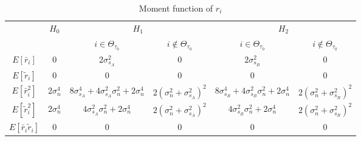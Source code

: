\begin{table}[h]
\centering
  \begin{tabular}{|c|c|c|c|c|c|}
	\hline
	\multirow{2}{*}{}           & \multirow{2}{*}{$H_0$} & \multicolumn{2}{c|}{$H_1$}                                                               & \multicolumn{2}{c|}{$H_2$}                                                               \\ \cline{3-6} 
	&                        & $i \in \Theta_{\tau_0}$                                                   & $i\notin \Theta_{\tau_0}$                          & $i\in \Theta_{\tau_0}$                                                   & $i\notin \Theta_{\tau_0}$                          \\ \hline
	$E[\bar{r}_i]$              & $0$                    & $2\sigma_{s_A}^2$                                       & $0$                            & $2\sigma_{s_B}^2$                                                         & $0$                            \\ \hline
	$E[\tilde{r}_i]$            & $0$                    & $0$                                                     & $0$                            & $0$                                                     & $0$                            \\ \hline
	$E[\bar{r}_i^2]$            & $2\sigma_n^4$          & $8\sigma_{s_A}^4+4\sigma_{s_A}^2\sigma_n^2+2\sigma_n^4$ & $2(\sigma_n^2+\sigma_{s_A}^2)^2$ & $8\sigma_{s_B}^4+4\sigma_{s_B}^2\sigma_n^2+2\sigma_n^4$ & $2(\sigma_n^2+\sigma_{s_B}^2)^2$ \\ \hline
	$E[\tilde{r}_i^2]$          & $2\sigma_n^4$          & $4\sigma_{s_A}^2\sigma_n^2+2\sigma_n^4$                 & $2(\sigma_n^2+\sigma_{s_A}^2)^2$ & $4\sigma_{s_B}^2\sigma_n^2+2\sigma_n^4$                 & $2(\sigma_n^2+\sigma_{s_B}^2)^2$ \\ \hline
	$E[\bar{r}_i\tilde{r}_i]$   & $0$                    & $0$                                                     & $0$                            & $0$                                                     & $0$                            \\ \hline
  \end{tabular}
  \caption{Moment function of $r_i$}
  \label{Table1}
\end{table}

